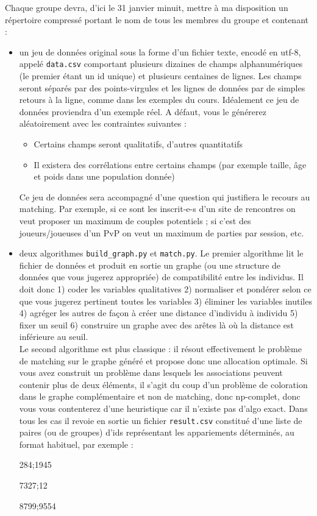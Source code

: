 \documentclass[a4paper,11pt]{article}
\begin{document}
Chaque groupe devra, d'ici le 31 janvier minuit, mettre à ma disposition un répertoire compressé portant le nom de tous les membres du groupe et contenant :
\begin{itemize}
\item un jeu de données original sous la forme d'un fichier texte, encodé en utf-8, appelé \texttt{data.csv} comportant plusieurs dizaines de champs alphanumériques (le premier étant un id unique) et plusieurs centaines de lignes. Les champs seront séparés par des points-virgules et les lignes de données par de simples retours à la ligne, comme dans les exemples du cours. Idéalement ce jeu de données proviendra d'un exemple réel. A défaut, vous le générerez aléatoirement avec les contraintes suivantes :
\begin{itemize}
	\item Certains champs seront qualitatifs, d'autres quantitatifs
	\item Il existera des corrélations entre certains champs (par exemple taille, âge et poids dans une population donnée) 
\end{itemize}
Ce jeu de données sera accompagné d'une question qui justifiera le recours au matching. Par exemple, si ce sont les inscrit-e-s d'un site de rencontres on veut proposer un maximum de couples potentiels ; si c'est des joueurs/joueuses d'un PvP on veut un maximum de parties par session, etc.

\item deux algorithmes \texttt{build\_graph.py} et \texttt{match.py}. Le premier algorithme lit le fichier de données et produit en sortie un graphe (ou une structure de données que vous jugerez appropriée) de compatibilité entre les individus. Il doit donc 1) coder les variables qualitatives 2) normaliser et pondérer selon ce que vous jugerez pertinent toutes les variables 3) éliminer les variables inutiles 4) agréger les autres de façon à créer une distance d'individu à individu 5) fixer un seuil 6) construire un graphe avec des arêtes là où la distance est inférieure au seuil.\\

Le second algorithme est plus classique : il résout effectivement le problème de matching sur le graphe généré et propose donc une allocation optimale. Si vous avez construit un problème dans lesquels les associations peuvent contenir plus de deux éléments, il s'agit du coup d'un problème de coloration dans le graphe complémentaire et non de matching, donc np-complet, donc vous vous contenterez d'une heuristique car il n'existe pas d'algo exact. Dans tous les cas il revoie en sortie un fichier \texttt{result.csv} constitué d'une liste de paires (ou de groupes) d'ids représentant les appariements déterminés, au format habituel, par exemple :
\begin{framed}
284;1945

7327;12

8799;9554
\end{framed}
\end{itemize}
\end{document}
